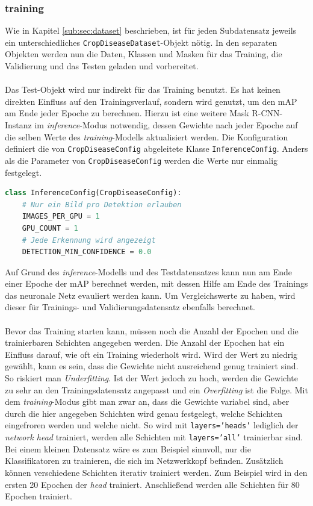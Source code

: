 \subsubsection{training}

Wie in Kapitel \ref{sub:sec:dataset} beschrieben, ist für jeden Subdatensatz jeweils ein unterschiedliches \texttt{CropDiseaseDataset}-Objekt nötig. In den separaten Objekten werden nun die Daten, Klassen und Masken für das Training, die Validierung und das Testen geladen und vorbereitet.
\\\\
Das Test-Objekt wird nur indirekt für das Training benutzt. Es hat keinen direkten Einfluss auf den Trainingsverlauf, sondern wird genutzt, um den mAP am Ende jeder Epoche zu berechnen. Hierzu ist eine weitere Mask R-CNN-Instanz im \textit{inference}-Modus notwendig, dessen Gewichte nach jeder Epoche auf die selben Werte des \textit{training}-Modells aktualisiert werden. Die Konfiguration definiert die von \texttt{CropDiseaseConfig} abgeleitete Klasse \texttt{InferenceConfig}. Anders als die Parameter von \texttt{CropDiseaseConfig} werden die Werte nur einmalig festgelegt.
\begin{lstlisting}[language=python,caption={InferenceConfig},captionpos=b]
class InferenceConfig(CropDiseaseConfig):
	# Nur ein Bild pro Detektion erlauben
	IMAGES_PER_GPU = 1
	GPU_COUNT = 1
	# Jede Erkennung wird angezeigt
	DETECTION_MIN_CONFIDENCE = 0.0
\end{lstlisting}
Auf Grund des \textit{inference}-Modells und des Testdatensatzes kann nun am Ende einer Epoche der mAP berechnet werden, mit dessen Hilfe am Ende des Trainings das neuronale Netz evauliert werden kann. Um Vergleichswerte zu haben, wird dieser für Trainings- und Validierungsdatensatz ebenfalls berechnet. 
\\\\
Bevor das Training starten kann, müssen noch die Anzahl der Epochen und die trainierbaren Schichten angegeben werden. Die Anzahl der Epochen hat ein Einfluss darauf, wie oft ein Training wiederholt wird. Wird der Wert zu niedrig gewählt, kann es sein, dass die Gewichte nicht ausreichend genug trainiert sind. So riskiert man \textit{Underfitting}. Ist der Wert jedoch zu hoch, werden die Gewichte zu sehr an den Trainingsdatensatz angepasst und ein \textit{Overfitting} ist die Folge. Mit dem \textit{training}-Modus gibt man zwar an, dass die Gewichte variabel sind, aber durch die hier angegeben Schichten wird genau festgelegt, welche Schichten eingefroren werden und welche nicht. So wird mit \texttt{layers='heads'} lediglich der \textit{network head} trainiert, werden alle Schichten mit \texttt{layers='all'} trainierbar sind. Bei einem kleinen Datensatz wäre es zum Beispiel sinnvoll, nur die Klassifikatoren zu trainieren, die sich im Netzwerkkopf befinden. Zusätzlich können verschiedene Schichten iterativ trainiert werden. Zum Beispiel wird in den ersten 20 Epochen der \textit{head} trainiert. Anschließend werden alle Schichten für 80 Epochen trainiert.

